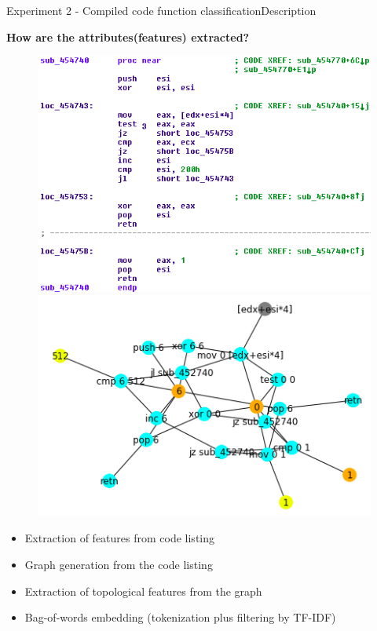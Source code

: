 \documentclass[xcolor=table]{beamer}
\begin{document}
\begin{frame}{Experiment 2 - Compiled code function classification}{Description}



\textbf{How are the attributes(features) extracted?}


\begin{figure}[H]
%
  \centering
    \includegraphics[width=0.9\linewidth]{img/code_graph02.png}
\endminipage
{}%
  \centering
    \includegraphics[width=0.9\linewidth]{img/code_graph01.png}
\endminipage
\end{figure}

\begin{itemize}
\item Extraction of features from code listing\\
\item Graph generation from the code listing\\
\item Extraction of topological features from the graph
\item Bag-of-words embedding (tokenization plus filtering by TF-IDF)
\end{itemize}



\end{frame}
\end{document}
